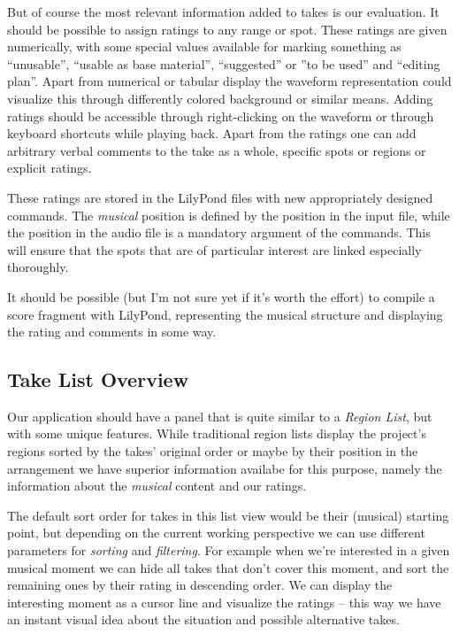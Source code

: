 \documentclass[11pt,a4paper]{article}
\begin{document}
But of course the most relevant information added to takes is our evaluation.
It should be possible to assign ratings to any range or spot.
These ratings are given numerically, with some special values available for
marking something as “unusable”, “usable as base material”, “suggested” or ”to
be used” and “editing plan”.
Apart from numerical or tabular display the waveform representation could
visualize this through differently colored background or similar means.
Adding ratings should be accessible through right-clicking on the waveform or
through keyboard shortcuts while playing back.
Apart from the ratings one can add arbitrary verbal comments to the take as a
whole, specific spots or regions or explicit ratings.

These ratings are stored in the LilyPond files with new appropriately designed
commands.
The \emph{musical} position is defined by the position in the input file, while
the position in the audio file is a mandatory argument of the commands.
This will ensure that the spots that are of particular interest are linked
especially thoroughly.

It should be possible (but I'm not sure yet if it's worth the effort) to compile
a score fragment with LilyPond, representing the musical structure and
displaying the rating and comments in some way.


\subsection{Take List Overview}
Our application should have a panel that is quite similar to a \emph{Region
List}, but with some unique features.
While traditional region lists display the project's regions sorted by the
takes' original order or maybe by their position in the arrangement we have
superior information availabe for this purpose, namely the information about the
\emph{musical} content and our ratings.

The default sort order for takes in this list view would be their (musical)
starting point, but depending on the current working perspective we can use
different parameters for \emph{sorting} and \emph{filtering}.
For example when we're interested in a given musical moment we can hide all
takes that don't cover this moment, and sort the remaining ones by their rating
in descending order.
We can display the interesting moment as a cursor line and visualize the ratings
-- this way we have an instant visual idea about the situation and possible
alternative takes.
\end{document}
